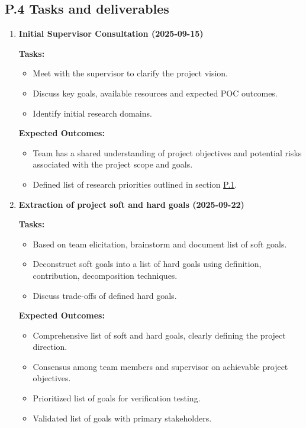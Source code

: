 \documentclass[12pt]{article}
\theoremstyle{definition}
\begin{document}
\subsection{P.4 Tasks and deliverables}

\begin{enumerate}

  \item \textbf{Initial Supervisor Consultation (2025-09-15)}  

  \textbf{Tasks:}
  \begin{itemize}
      \item Meet with the supervisor to clarify the project vision. 
      \item Discuss key goals, available resources and expected POC outcomes. 
      \item Identify initial research domains. 
  \end{itemize}

  \textbf{Expected Outcomes:}
  \begin{itemize}
      \item Team has a shared understanding of project objectives and potential
       risks associated with the project scope and goals. 
      \item Defined list of research priorities outlined in section
      \hyperref[item: p1]{P.1}.
  \end{itemize}

  \vspace{0.8em}

  \item \textbf{Extraction of project soft and hard goals (2025-09-22)}  

  \textbf{Tasks:}
  \begin{itemize}
      \item Based on team elicitation, brainstorm and document list of soft
      goals. 
      \item Deconstruct soft goals into a list of hard goals using definition,
       contribution, decomposition techniques. 
      \item Discuss trade-offs of defined hard goals. 
  \end{itemize}

  \textbf{Expected Outcomes:}
  \begin{itemize}
      \item Comprehensive list of soft and hard goals, clearly defining the
      project direction. 
      \item Consensus among team members and supervisor on achievable project
       objectives. 
      \item Prioritized list of goals for verification testing. 
      \item Validated list of goals with primary stakeholders. 
  \end{itemize}


\end{enumerate}
\end{document}
